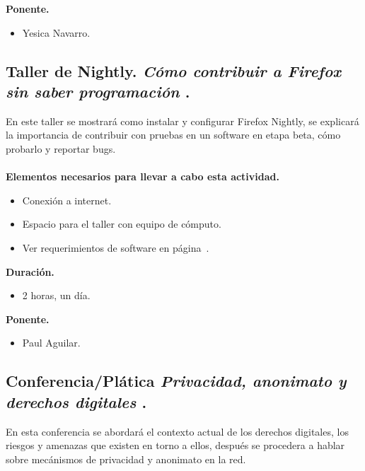 \documentclass[a4paper,11pt]{article}                 %
\begin{document}
              \textbf{Ponente.}
  \begin{itemize}
    \item Yesica Navarro.
  \end{itemize}
  
  
                \subsection{Taller de Nightly. \textit{Cómo contribuir a Firefox sin saber programación} .}                                     %

   En este taller se mostrará como instalar y configurar Firefox Nightly, se explicará la importancia de contribuir con pruebas en un software en etapa beta, cómo probarlo y reportar bugs. 
      \paragraph{}
  \textbf{Elementos necesarios para llevar a cabo esta actividad.}
  \begin{itemize}
    \label{list:nightly}
    \item Conexión a internet.
    \item Espacio para el taller con equipo de cómputo.
    \item Ver requerimientos de software en página~\pageref{list:nightlys}.
  \end{itemize}
  
  \textbf{Duración.}
  \begin{itemize}
    \item 2 horas, un día.
  \end{itemize}
  
              \textbf{Ponente.}
  \begin{itemize}
    \item Paul Aguilar.
  \end{itemize}
  
  \vspace{1 cm}
  
            \subsection{Conferencia/Plática  \textit{Privacidad, anonimato y derechos digitales} .}                                     %

   En esta conferencia se abordará el contexto actual de los derechos digitales, los riesgos y amenazas que existen en torno a ellos, después se procedera a hablar sobre mecánismos de privacidad y anonimato en la red.
\end{document}
